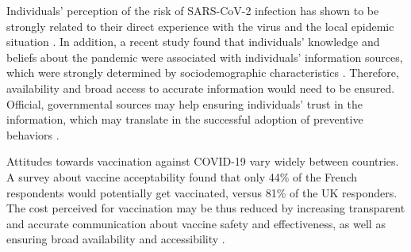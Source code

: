 Individuals' perception of the risk of SARS-CoV-2 infection has shown to be strongly related to their direct experience with the virus and the local epidemic situation \cite[]{Mansilla2020,Elharake2021}. In addition, a recent study found that individuals' knowledge and beliefs about the pandemic were associated with individuals' information sources, which were strongly determined by sociodemographic characteristics \cite[]{Ali2020}. Therefore, availability and broad access to accurate information would need to be ensured. Official, governmental sources may help ensuring individuals' trust in the information, which may translate in the successful adoption of preventive behaviors \cite[]{Lim2020}.

Attitudes towards vaccination against COVID-19 vary widely between countries. A survey about vaccine acceptability \cite{Wuoters2021} found that only 44\% of the French respondents would potentially get vaccinated, versus 81\% of the UK responders. The cost perceived for vaccination may be thus reduced by increasing transparent and accurate communication about vaccine safety and effectiveness, as well as ensuring broad availability and accessibility \cite[]{Wuoters2021}. 

%

